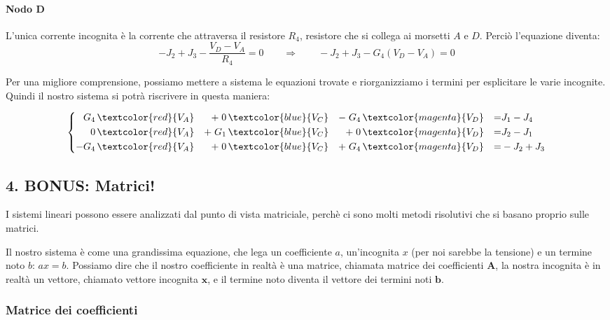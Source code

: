 \paragraph{Nodo D}
L'unica corrente incognita è la corrente che attraversa il resistore $R_4$, resistore che si collega ai morsetti $A$ e $D$. Perciò l'equazione diventa:
\begin{equation}
- J_2 + J_3 - \frac{V_D - V_A}{R_4} = 0 \qquad \Rightarrow \qquad - J_2 + J_3 - G_4\left(V_D-V_A\right) = 0
\label{eq:nodoD_Ohm}
\end{equation}




Per una migliore comprensione, possiamo mettere a sistema le equazioni trovate e riorganizziamo i termini per esplicitare le varie incognite.
Quindi il nostro sistema si potrà riscrivere in questa maniera:

\begin{equation}
\left\{
\begin{aligned}
G_4\, & \textcolor{red}{V_A} & +\; 0\, & \textcolor{blue}{V_C} & -\; G_4\, & \textcolor{magenta}{V_D} & = & J_1 - J_4 \\
0\, & \textcolor{red}{V_A} & +\; G_1\, & \textcolor{blue}{V_C} & +\; 0\, & \textcolor{magenta}{V_D} & = & J_2 - J_1 \\
-G_4\, & \textcolor{red}{V_A} & +\; 0\, & \textcolor{blue}{V_C} & +\; G_4\, & \textcolor{magenta}{V_D} & = & -J_2 + J_3
\end{aligned}
\right.
\end{equation}

\subsection*{4. BONUS: Matrici!}

I sistemi lineari possono essere analizzati dal punto di vista matriciale, perchè ci sono molti metodi risolutivi che si basano proprio sulle matrici.

Il nostro sistema è come una grandissima equazione, che lega un coefficiente $a$, un'incognita $x$ (per noi sarebbe la tensione) e un termine noto $b$: $ax = b$. Possiamo dire che il nostro coefficiente in realtà è una matrice, chiamata matrice dei coefficienti $\mathbf{A}$, la nostra incognita è in realtà un vettore, chiamato vettore incognita $\mathbf{x}$, e il termine noto diventa il vettore dei termini noti $\mathbf{b}$.

\subsubsection*{Matrice dei coefficienti}

